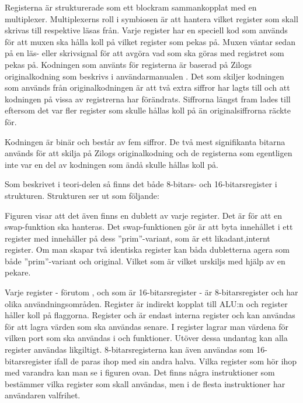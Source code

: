 \documentclass[main.tex]{subfiles}
\begin{document}
Registerna är strukturerade som ett blockram sammankopplat med en multiplexer.
Multiplexerns roll i symbiosen är att hantera vilket register som skall skrivas
till respektive läsas från. Varje register har en speciell kod som används för
att muxen ska hålla koll på vilket register som pekas på. Muxen väntar sedan på
en läs- eller skrivsignal för att avgöra vad som ska göras med registret som
pekas på. Kodningen som använts för registerna är baserad på Zilogs
originalkodning som beskrivs i användarmanualen \cite{z80um}. Det som skiljer
kodningen som används från originalkodningen är att två extra siffror har lagts
till och att kodningen på vissa av registrerna har förändrats. Siffrorna längst
fram lades till eftersom det var fler register som skulle hållas koll på än
originalsiffrorna räckte för.

Kodningen är binär och består av fem siffror. De två mest signifikanta bitarna
används för att skilja på Zilogs originalkodning och de registerna som
egentligen inte var en del av kodningen som ändå skulle hållas koll på.

Som beskrivet i teori-delen så finns det både 8-bitars- och 16-bitarsregister i
strukturen. Strukturen ser ut som följande:

Figuren visar att det även finns en dublett av varje register. Det är för att
en swap-funktion ska hanteras. Det swap-funktionen gör är att byta innehållet i
ett register med innehåller på dess ''prim''-variant, som är ett
likadant,internt register. Om man skapar två identiska register kan båda
dubletterna agera som både ''prim''-variant och original. Vilket som är vilket
urskiljs med hjälp av en pekare.

Varje register - förutom ,  och  som är
16-bitarsregister - är 8-bitarsregister och har olika användningsområden.
Register  är indirekt kopplat till ALU:n och register  håller
koll på flaggorna. Register  och  är endast interna register
och kan användas för att lagra värden som ska användas senare. I register
 lagrar man värdena för vilken port som ska användas i  och
 funktioner. Utöver dessa undantag kan alla register användas
likgiltigt. 8-bitarsregisterna kan även användas som 16-bitarsregister ifall de
paras ihop med sin andra halva. Vilka register som hör ihop med varandra kan
man se i figuren ovan. Det finns några instruktioner som bestämmer vilka
register som skall användas, men i de flesta instruktioner har användaren
valfrihet.
\end{document}

